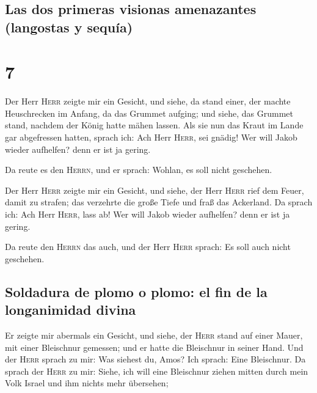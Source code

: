 \hypertarget{las-dos-primeras-visionas-amenazantes-langostas-y-sequuxeda}{%
\subsection{Las dos primeras visionas amenazantes (langostas y
sequía)}\label{las-dos-primeras-visionas-amenazantes-langostas-y-sequuxeda}}

\hypertarget{section-6}{%
\section{7}\label{section-6}}

 Der Herr \textsc{Herr} zeigte mir ein Gesicht, und siehe,
da stand einer, der machte Heuschrecken im Anfang, da das Grummet
aufging; und siehe, das Grummet stand, nachdem der König hatte mähen
lassen.  Als sie nun das Kraut im Lande gar abgefressen
hatten, sprach ich: Ach Herr \textsc{Herr}, sei gnädig! Wer will Jakob
wieder aufhelfen? denn er ist ja gering.

 Da reute es den \textsc{Herrn}, und er sprach: Wohlan, es
soll nicht geschehen.

 Der Herr \textsc{Herr} zeigte mir ein Gesicht, und siehe,
der Herr \textsc{Herr} rief dem Feuer, damit zu strafen; das verzehrte
die große Tiefe und fraß das Ackerland.  Da sprach ich:
Ach Herr \textsc{Herr}, lass ab! Wer will Jakob wieder aufhelfen? denn
er ist ja gering.

 Da reute den \textsc{Herrn} das auch, und der Herr
\textsc{Herr} sprach: Es soll auch nicht geschehen.

\hypertarget{soldadura-de-plomo-o-plomo-el-fin-de-la-longanimidad-divina}{%
\subsection{Soldadura de plomo o plomo: el fin de la longanimidad
divina}\label{soldadura-de-plomo-o-plomo-el-fin-de-la-longanimidad-divina}}

 Er zeigte mir abermals ein Gesicht, und siehe, der
\textsc{Herr} stand auf einer Mauer, mit einer Bleischnur gemessen; und
er hatte die Bleischnur in seiner Hand.  Und der
\textsc{Herr} sprach zu mir: Was siehest du, Amos? Ich sprach: Eine
Bleischnur. Da sprach der \textsc{Herr} zu mir: Siehe, ich will eine
Bleischnur ziehen mitten durch mein Volk Israel und ihm nichts mehr
übersehen;

